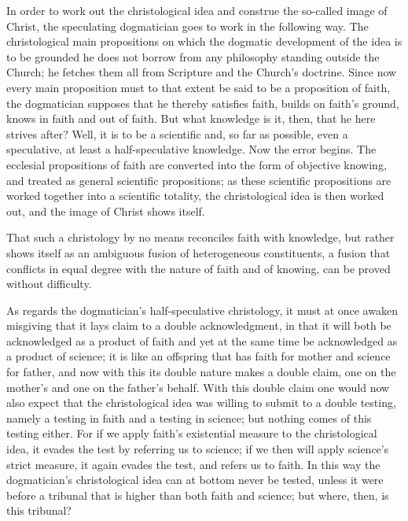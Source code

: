 \documentclass[12pt,a4paper]{book}
\begin{document}
In order to work out the christological idea and construe the so-called image of Christ, the
speculating dogmatician goes to work in the following way. The christological main
propositions on which the dogmatic development of the idea is to be grounded he does not
borrow from any philosophy standing outside the Church; he fetches them all from Scripture
and the Church's doctrine. Since now every main proposition must to that extent be said to
be a proposition of faith, the dogmatician supposes that he thereby satisfies faith, builds
on faith's ground, knows in faith and out of faith. But what knowledge is it, then, that he
here strives after? Well, it is to be a scientific and, so far as possible, even a
speculative, at least a half-speculative knowledge. Now the error begins. The ecclesial
propositions of faith are converted into the form of objective knowing, and treated as
general scientific propositions; as these scientific propositions are worked together into a
scientific totality, the christological idea is then worked out, and the image of Christ
shows itself.

That such a christology by no means reconciles faith with
knowledge, but rather shows itself as an ambiguous fusion of heterogeneous constituents, a
fusion that conflicts in equal degree with the nature of faith and of knowing, can be proved
without difficulty.

As regards the dogmatician's half-speculative christology, it must at once awaken misgiving
that it lays claim to a double acknowledgment, in that it will both be acknowledged as a
product of faith and yet at the same time be acknowledged as a product of science; it is
like an offspring that has faith for mother and science for father, and now with this its
double nature makes a double claim, one on the mother's and one on the father's behalf. With
this double claim one would now also expect that the christological idea was willing to
submit to a double testing, namely a testing in faith and a testing in science; but nothing
comes of this testing either. For if we apply faith's existential measure to the
christological idea, it evades the test by referring us to science; if we then will apply
science's strict measure, it again evades the test, and refers us to faith. In this way the
dogmatician's christological idea can at bottom never be tested, unless it were before a
tribunal that is higher than both faith and science; but where, then, is this tribunal?
\end{document}
